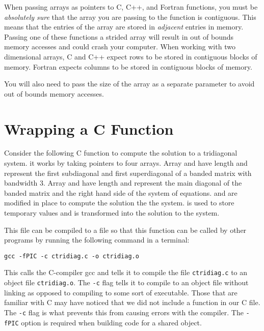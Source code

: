 \begin{warn}
When passing arrays as pointers to C, C++, and Fortran functions, you must be \emph{absolutely sure} that the array you are passing to the function is contiguous.
This means that the entries of the array are stored in \emph{adjacent} entries in memory.
Passing one of these functions a strided array will result in out of bounds memory accesses and could crash your computer.
When working with two dimensional arrays, C and C++ expect rows to be stored in contiguous blocks of memory.
Fortran expects columns to be stored in contiguous blocks of memory.

You will also need to pass the size of the array as a separate parameter to avoid out of bounds memory accesses.
\end{warn}

\section*{Wrapping a C Function}
Consider the following C function to compute the solution to a tridiagonal system.
it works by taking pointers to four arrays.
Array  and  have length  and represent the first subdiagonal and first superdiagonal of a banded matrix with bandwidth 3.
Array  and  have length  and represent the main diagonal of the banded matrix and the right hand side of the system of equations.
 and  are modified in place to compute the solution the the system.
 is used to store temporary values and  is transformed into the solution to the system.



This file can be compiled to a  file so that this function can be called by other programs by running the following command in a terminal:
\begin{lstlisting}[style=ShellInput]
gcc -fPIC -c ctridiag.c -o ctridiag.o
\end{lstlisting}
This calls the C-compiler gcc and tells it to compile the file \texttt{ctridiag.c} to an object file \texttt{ctridiag.o}.
The \texttt{-c} flag tells it to compile to an object file without linking as opposed to compiling to some sort of executable.
Those that are familiar with C may have noticed that we did not include a  function in our C file.
The \texttt{-c} flag is what prevents this from causing errors with the compiler.
The \texttt{-fPIC} option is required when building code for a shared object.

